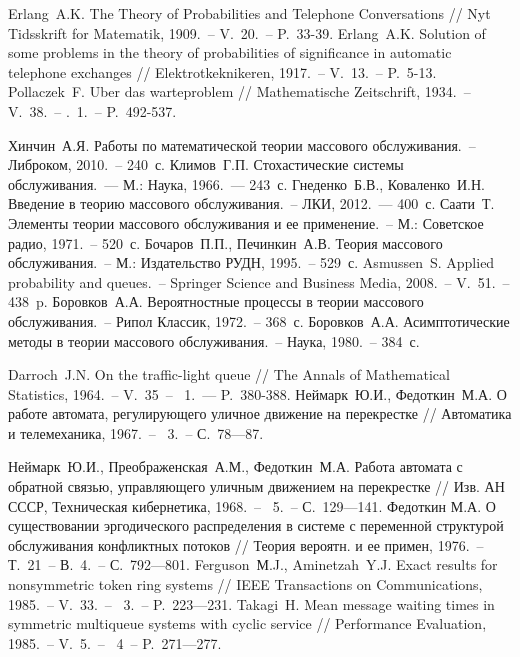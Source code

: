 \documentclass[a4paper,12pt,russian]{extarticle}
\newcommand{\No}{\textnumero}
\begin{document}
\begin{thebibliography}{99}
 Erlang~A.K.  The Theory of Probabilities and Telephone Conversations //  Nyt Tidsskrift for Matematik, 1909.~-- V.~20.~-- P.~33-39.
 Erlang~A.K. Solution of some problems in the theory of probabilities of significance in automatic telephone exchanges // Elektrotkeknikeren, 1917.~-- V.~13.~-- P.~5-13.
 Pollaczek~F. Uber das warteproblem // Mathematische Zeitschrift, 1934.~-- V.~38.~-- \No{}.~1.~-- P.~492-537.

 Хинчин~А.Я. Работы по математической теории массового обслуживания.~-- Либроком, 2010.~-- 240~с.
 Климов~Г.П. Стохастические системы обслуживания.~--- М.: Наука, 1966.~--- 243~с.
 Гнеденко~Б.В., Коваленко~И.Н. Введение в теорию массового обслуживания.~-- ЛКИ, 2012.~--- 400~с.
 Саати~Т. Элементы теории массового обслуживания и ее применение.~-- М.: Советское радио, 1971.~-- 520~с.
 Бочаров~П.П., Печинкин~А.В. Теория массового обслуживания.~-- М.: Издательство РУДН, 1995.~-- 529~с.
 Asmussen~S. Applied probability and queues.~-- Springer Science and Business Media, 2008.~-- V.~51.~-- 438~p.
 Боровков~А.А. Вероятностные процессы в теории массового обслуживания.~-- Рипол Классик, 1972.~-- 368~с.
 Боровков~А.А. Асимптотические методы в теории массового обслуживания.~-- Наука, 1980.~-- 384~с.

 Darroch~J.N. On the traffic-light queue // The Annals of Mathematical Statistics, 1964.~-- V.~35~-- \No{}~1.~--- P.~380-388. 
 Неймарк~Ю.И., Федоткин~М.А. О работе автомата, регулирующего уличное движение на перекрестке // Автоматика и телемеханика, 1967.~-- \No{}~3.~-- С.~78—87.  

 Неймарк~Ю.И., Преображенская~А.М., Федоткин~М.А. Работа автомата с обратной связью, управляющего уличным движением на перекрестке // Изв. АН СССР, Техническая кибернетика, 1968.~-- \No{}~5.~-- С.~129—141. 
 Федоткин М.А. О существовании эргодического распределения в системе с переменной структурой обслуживания конфликтных потоков // Теория вероятн. и ее примен, 1976.~-- Т.~21~-- В.~4.~-- С.~792—801.
 Ferguson~М.J., Aminetzah~Y.J. Exact results for nonsymmetric token ring systems // IEEE Transactions on Communications, 1985.~-- V.~33.~-- \No{}~3.~-- P.~223—231.
 Takagi~H. Mean message waiting times in symmetric multiqueue systems with cyclic service // Performance Evaluation, 1985.~-- V.~5.~-- \No{}~4~-- P.~271—277.  


\end{thebibliography}
\end{document}
